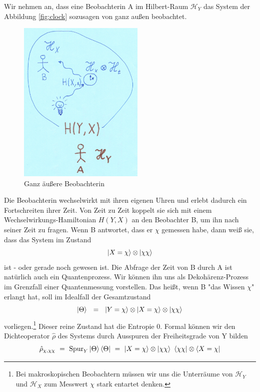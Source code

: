 \documentclass[12pt]{article}
\begin{document}
Wir nehmen an, dass eine Beobachterin A im Hilbert-Raum $\mathscr{H}_Y$ das System der Abbildung \ref{fig:clock} sozusagen von ganz außen beobachtet. 
\begin{figure}[!h]\begin{center}
  \includegraphics[width=6cm]{Entropie.png}
  \caption{Ganz äußere Beobachterin}
  \label{fig:entropy}
\end{center}\end{figure}
Die Beobachterin wechselwirkt mit ihren eigenen Uhren und erlebt dadurch ein Fortschreiten ihrer Zeit. Von Zeit zu Zeit koppelt sie sich mit einem Wechselwirkungs-Hamiltonian $H(Y,X)$ an den Beobachter B, um ihn nach seiner Zeit zu fragen. Wenn B antwortet, dass er $\chi$ gemessen habe, dann weiß sie, dass das System im Zustand 
\begin{equation}
\ket{X=\chi}\otimes\ket{\chi\chi}
\end{equation}
ist - oder gerade noch gewesen ist. Die Abfrage der Zeit von B durch A ist natürlich auch ein Quantenprozess. Wir können ihn uns als Dekohärenz-Prozess im Grenzfall einer Quantenmessung vorstellen. Das heißt, wenn B "das Wissen $\chi$" erlangt hat, soll im Idealfall der Gesamtzustand
\begin{equation}
\ket{\Theta}\ \ =\ \ \ket{Y=\chi}\otimes\ket{X=\chi}\otimes\ket{\chi\chi}
\end{equation}
vorliegen.\footnote{Bei makroskopischen Beobachtern müssen wir uns die Unterräume von $\mathscr{H}_Y$ und $\mathscr{H}_X$ zum Messwert $\chi$ stark entartet denken.}  Dieser reine Zustand hat die Entropie 0. Formal können wir den Dichteoperator $\hat{\rho}$ des Systems durch Ausspuren der Freiheitsgrade von Y bilden
\begin{equation}
\hat{\rho}_{\chi,\chi\chi}\ =\ \operatorname{Spur}_Y \ket{\Theta}\bra{\Theta}\ =\ 
\ket{X=\chi}\otimes\ket{\chi\chi}\ \bra{\chi\chi}\otimes\bra{X=\chi} 
\end{equation}
\end{document}
